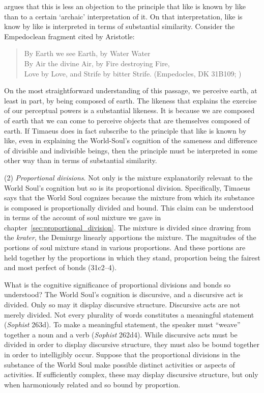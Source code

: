 \citet{Corcilius:2018bd} argues that this is less an objection to the principle that like is known by like than to a certain `archaic' interpretation of it. On that interpretation, like is know by like is interpreted in terms of substantial similarity. Consider the Empedoclean fragment cited by Aristotle:
\begin{verse}
	By Earth we see Earth, by Water Water\\
	By Air the divine Air, by Fire destroying Fire,\\
	Love by Love, and Strife by bitter Strife.
	(Empedocles, DK 31B109; \citealt{Hett:1936fk})
\end{verse}
On the most straightforward understanding of this passage, we perceive earth, at least in part, by being composed of earth. The likeness that explains the exercise of our perceptual powers is a substantial likeness. It is because we are composed of earth that we can come to perceive objects that are themselves composed of earth. If Timaeus does in fact subscribe to the principle that like is known by like, even in explaining the World-Soul's cognition of the sameness and difference of divisible and indivisible beings, then the principle must be interpreted in some other way than in terms of substantial similarity.

(2) \emph{Proportional divisions}. Not only is the mixture explanatorily relevant to the World Soul's cognition but so is its proportional division. Specifically, Timaeus says that the World Soul cognizes because the mixture from which its substance is composed is proportionally divided and bound. This claim can be understood in terms of the account of soul mixture we gave in chapter~\ref{sec:proportional_division}. The mixture is divided since drawing from the \emph{krater}, the Demiurge linearly apportions the mixture. The magnitudes of the portions of soul mixture stand in various proportions. And these portions are held together by the proportions in which they stand, proportion being the fairest and most perfect of bonds (31c2--4).

What is the cognitive significance of proportional divisions and bonds so understood? The World Soul's cognition is discursive, and a discursive act is divided. Only so may it display discursive structure. Discursive acts are not merely divided. Not every plurality of words constitutes a meaningful statement (\emph{Sophist} 263d). To make a meaningful statement, the speaker must ``weave'' together a noun and a verb (\emph{Sophist} 262d4). While discursive acts must be divided in order to display discursive structure, they must also be bound together in order to intelligibly occur. Suppose that the proportional divisions in the substance of the World Soul make possible distinct activities or aspects of activities. If sufficiently complex, these may display discursive structure, but only when harmoniously related and so bound by proportion.

